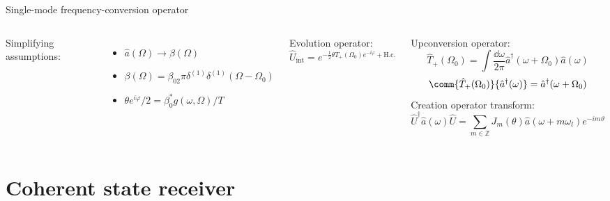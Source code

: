 \documentclass[aspectratio=169,usenames,dvipsnames]{beamer}
\begin{document}
	\begin{frame}{Single-mode frequency-conversion operator}
		\begin{columns}[c, onlytextwidth]
			Simplifying assumptions:
			\begin{itemize}
				\item $\hat{a}(\Omega)\to\beta(\Omega)$
				\item $\beta(\Omega)=\beta_02\pi\delta^{(1)}\delta^{(1)}(\Omega-\Omega_0)$
				\item $\theta e^{i\varphi}/2=\beta_0^*g(\omega,\Omega)/T$
			\end{itemize}
			Evolution operator:
			\begin{equation}
				\hat{U}_\text{int}
				=
				e^{
					-
					\frac{1}{2}
					\theta
					\hat{T}_+(\Omega_0)
					e^{-i\varphi}
					+
					\text{H.c.}
				}
			\end{equation}

			Upconversion operator:
			\begin{equation}
				\hat{T}_+(\Omega_0)
				=
				\int\frac{\dd{\omega}}{2\pi}
				\hat{a}^\dagger(\omega+\Omega_0)
				\hat{a}(\omega)
			\end{equation}
			\begin{equation}
				\comm{\hat{T}_+(\Omega_0)}{\hat{a}^\dagger(\omega)}
				=
				\hat{a}^\dagger(\omega+\Omega_0)
			\end{equation}
			Creation operator transform:
			\begin{equation}
				\hat{U}^\dagger
				\hat{a}(\omega)
				\hat{U}
				=
				\sum_{m\in\mathbb{Z}}
				J_m(\theta)
				\hat{a}(\omega+m\omega_l)
				e^{-im\vartheta}				
			\end{equation}
		\end{columns}
	\end{frame}
	
	\section{Coherent state receiver}
	
\end{document}
